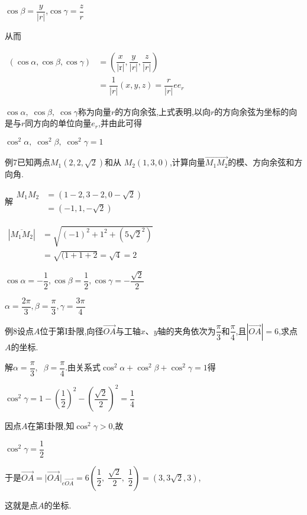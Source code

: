 \documentclass[oneside]{book}
\begin{document}
$\cos \beta  = \dfrac{y}{{|r|}}$,$\cos \gamma  = \dfrac{z}{r}$

从而

$\begin{aligned}(\cos \alpha, \cos \beta, \cos \gamma) &=\left(\dfrac{x}{|\mathrm{r}|}, \dfrac{y}{|r|}, \dfrac{z}{|r|}\right) \\ &=\dfrac{1}{|r|}(x, y, z)=\dfrac{r}{|r|} e e_{r} \end{aligned}$

$\cos \alpha ,\;\cos \beta ,\;\cos \gamma $称为向量$r$的方向余弦,上式表明,以向$r$的方向余弦为坐标的向是与$r$同方向的单位向量${e_r}$,并由此可得

${\cos ^2}\alpha ,\;{\cos ^2}\beta ,\;{\cos ^2}\gamma  = 1$

例7已知两点${M_1}(2,2,\sqrt 2 )$和从
${M_2}(1,3,0)$,计算向量$\overrightarrow {{M_1}{M_2}} $的模、方向余弦和方向角.

解$\begin{aligned} M_{1} M_{2} &=(1-2,3-2,0-\sqrt{2}) \\ &=(-1,1,-\sqrt{2}) \end{aligned}$

$\begin{aligned}|\overline{M_{1} M_{2}}| &=\sqrt{(-1)^{2}+1^{2}+\left(5 \sqrt{2}^{2}\right)} \\ &=\sqrt{(1+1+2}=\sqrt{4}=2 \end{aligned}$

$\cos \alpha=-\dfrac{1}{2}, \cos \beta=\dfrac{1}{2}, \cos \gamma=-\dfrac{\sqrt{2}}{2}$

$\alpha=\dfrac{2 \pi}{3}, \beta=\dfrac{\pi}{3}, \gamma=\dfrac{3 \pi}{4}$

例8设点$A$位于第I卦限,向径$\overrightarrow {OA} $与工轴$x$、$y$轴的夹角依次为$\dfrac{\pi }{3}$和$\dfrac{\pi }{4}$,且$|\overrightarrow {OA} | = 6$,求点$A$的坐标.

解$\alpha  = \dfrac{\pi }{3},\;\;\beta  = \dfrac{\pi }{4}$.由关系式$\cos^2\alpha  + \cos^2\beta  + \cos^2\gamma  = 1$得

${\cos ^2}\gamma  = 1 - {(\dfrac{1}{2})^2} - {(\dfrac{{\sqrt 2 }}{2})^2} = \dfrac{1}{4}$

因点$A$在第I卦限,知$\cos^2\gamma  > 0$,故

${\cos ^2}\gamma  = \dfrac{1}{2}$

于是$\overrightarrow {OA}  = |\overrightarrow {OA} {|_{e\overrightarrow {OA} }} = 6(\dfrac{1}{2},\;\dfrac{{\sqrt 2 }}{2},\;\dfrac{1}{2}) = (3,3\sqrt 2 ,3)$,

这就是点$A$的坐标.
\end{document}
